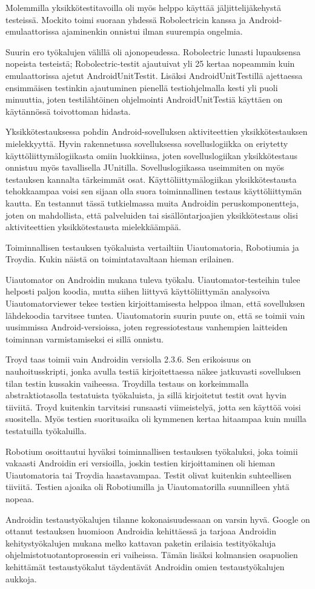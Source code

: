 Molemmilla yksikkötestitavoilla oli myös helppo käyttää jäljittelijäkehystä testeissä. Mockito toimi suoraan yhdessä Robolectricin kanssa ja Android-emulaattorissa ajaminenkin onnistui ilman suurempia ongelmia.

Suurin ero työkalujen välillä oli ajonopeudessa. Robolectric lunasti lupauksensa nopeista testeistä; Robolectric-testit ajautuivat yli 25 kertaa nopeammin kuin emulaattorissa ajetut AndroidUnitTestit. Lisäksi AndroidUnitTestillä ajettaessa ensimmäisen testinkin ajautuminen pienellä testiohjelmalla kesti yli puoli minuuttia, joten testilähtöinen ohjelmointi AndroidUnitTestiä käyttäen on käytännössä toivottoman hidasta.

Yksikkötestauksessa pohdin Android-sovelluksen aktiviteettien yksikkötestauksen mielekkyyttä. Hyvin rakennetussa sovelluksessa sovelluslogiikka on eriytetty käyttöliittymälogiikasta omiin luokkiinsa, joten sovelluslogiikan yksikkötestaus onnistuu myös tavallisella JUnitilla. Sovelluslogiikassa useimmiten on myös testauksen kannalta tärkeimmät osat. Käyttöliittymälogiikan yksikkötestausta tehokkaampaa voisi sen sijaan olla suora toiminnallinen testaus käyttöliittymän kautta. En testannut tässä tutkielmassa muita Androidin peruskomponentteja, joten on mahdollista, että palveluiden tai sisällöntarjoajien yksikkötestaus olisi aktiviteettien yksikkötestausta mielekkäämpää.

Toiminnallisen testauksen työkaluista vertailtiin Uiautomatoria, Robotiumia ja Troydia. Kukin näistä on toimintatavaltaan hieman erilainen. 

Uiautomator on Androidin mukana tuleva työkalu. Uiautomator-testeihin tulee helposti paljon koodia, mutta siihen liittyvä käyttöliittymän analysoiva Uiautomatorviewer tekee testien kirjoittamisesta helppoa ilman, että sovelluksen lähdekoodia tarvitsee tuntea. Uiautomatorin suurin puute on, että se toimii vain uusimmissa Android-versioissa, joten regressiotestaus vanhempien laitteiden toiminnan varmistamiseksi ei sillä onnistu.

Troyd taas toimii vain Androidin versiolla 2.3.6. Sen erikoisuus on nauhoitusskripti, jonka avulla testiä kirjoitettaessa näkee jatkuvasti sovelluksen tilan testin kussakin vaiheessa. Troydilla testaus on korkeimmalla abstraktiotasolla testatuista työkaluista, ja sillä kirjoitetut testit ovat hyvin tiiviitä. Troyd kuitenkin tarvitsisi runsaasti viimeistelyä, jotta sen käyttöä voisi suositella. Myös testien suoritusaika oli kymmenen kertaa hitaampaa kuin muilla testatuilla työkaluilla.

Robotium osoittautui hyväksi toiminnallisen testauksen työkaluksi, joka toimii vakaasti Androidin eri versioilla, joskin testien kirjoittaminen oli hieman Uiautomatoria tai Troydia haastavampaa. Testit olivat kuitenkin suhteellisen tiiviitä. Testien ajoaika oli Robotiumilla ja Uiautomatorilla suunnilleen yhtä nopeaa. 

Androidin testaustyökalujen tilanne kokonaisuudessaan on varsin hyvä. Google on ottanut testauksen huomioon Androidia kehittäessä ja tarjoaa Androidin kehitystyökalujen mukana melko kattavan paketin erilaisia testityökaluja ohjelmistotuotantoprosessin eri vaiheissa. Tämän lisäksi kolmansien osapuolien kehittämät testaustyökalut täydentävät Androidin omien testaustyökalujen aukkoja.